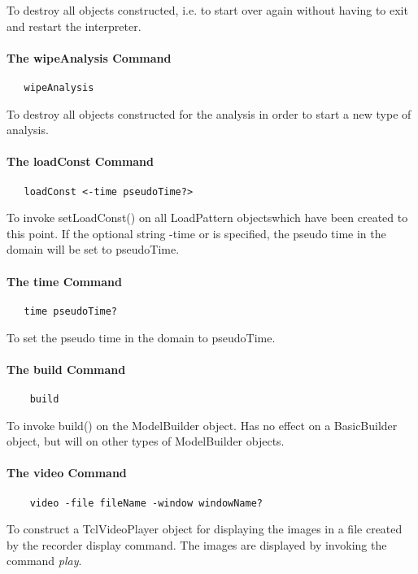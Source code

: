 \documentclass[12pt]{article}
\begin{document}
\noindent To destroy all objects constructed, i.e. to start over again
without having to exit and restart the interpreter.

\paragraph {The wipeAnalysis Command}

{\sf\small
\begin{verbatim}
   wipeAnalysis
\end{verbatim}
}

\noindent To destroy all objects constructed for the analysis in order
to start a new type of analysis.

\paragraph {The loadConst Command}

{\sf\small
\begin{verbatim}
   loadConst <-time pseudoTime?>
\end{verbatim}
}

\noindent To invoke setLoadConst() on all LoadPattern objectswhich
have been created to this point. If the optional string -time or
is specified, the pseudo time in the domain will be set to pseudoTime.

\paragraph {The time Command}

{\sf\small
\begin{verbatim}
   time pseudoTime?
\end{verbatim}
}

\noindent To set the pseudo time in the domain to pseudoTime.

\paragraph {The build Command}

{\sf\small
\begin{verbatim}
    build
\end{verbatim}
}

\noindent To invoke build() on the ModelBuilder object. Has no effect
on a BasicBuilder object, but will on other types of ModelBuilder objects.

\paragraph {The video Command}

{\sf\small
\begin{verbatim}
    video -file fileName -window windowName?
\end{verbatim}
}

\noindent To construct a TclVideoPlayer object for displaying the images in a file
created by the recorder display command. The images are displayed by invoking the 
command {\em play}.
\end{document}
